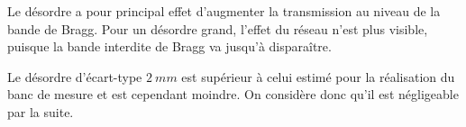Le désordre a pour principal effet d'augmenter la transmission au niveau de la bande de Bragg. Pour un désordre grand, l'effet du réseau n'est plus visible, puisque la bande interdite de Bragg va jusqu'à disparaître.

Le désordre d'écart-type $2~mm$ est supérieur à celui estimé pour la réalisation du banc de mesure et est cependant moindre. On considère donc qu'il est négligeable par la suite.



